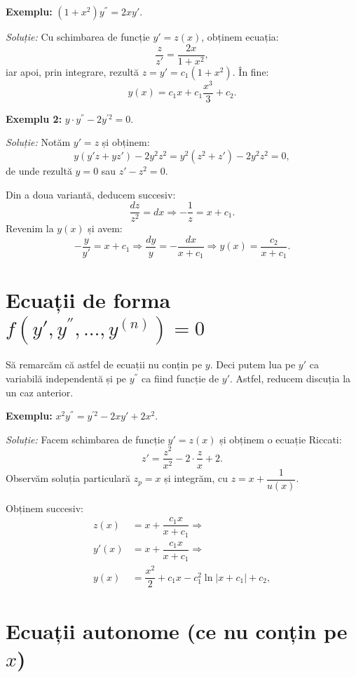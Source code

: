 \textbf{Exemplu:} $ (1 + x^2)y^{''} = 2xy' $.

\emph{Soluție:} Cu schimbarea de funcție $ y' = z(x) $, obținem ecuația:
\[
  \dfrac{z}{z'} = \dfrac{2x}{1 + x^2},
\]
iar apoi, prin integrare, rezultă $ z = y' = c_1(1 + x^2) $. În fine:
\[
  y(x) = c_1 x + c_1 \dfrac{x^3}{3} + c_2.
\]
\vspace{1cm}

\textbf{Exemplu 2:} $ y \cdot y^{''} - 2y^{'2} = 0 $.

\emph{Soluție:} Notăm $ y' = z $ și obținem:
\[
  y(y'z + yz') - 2y^2 z^2 = y^2(z^2 + z') - 2y^2 z^2 = 0,
\]
de unde rezultă $ y = 0 $ sau $ z' - z^2 = 0 $.

Din a doua variantă, deducem succesiv:
\[
  \dfrac{dz}{z^2} = dx \Rightarrow -\dfrac{1}{z} = x + c_1.
\]
Revenim la $ y(x) $ și avem:
\[
  - \dfrac{y}{y'} = x + c_1 \Rightarrow \dfrac{dy}{y} = -\dfrac{dx}{x + c_1} %
  \Rightarrow y(x) = \dfrac{c_2}{x + c_1}.
\]


\section{Ecuații de forma $ f(y', y^{''}, \dots, y^{(n)}) = 0 $}

Să remarcăm că astfel de ecuații nu conțin pe $ y $. Deci putem lua pe $ y' $
ca variabilă independentă și pe $ y^{''} $ ca fiind funcție de $ y' $.
Astfel, reducem discuția la un caz anterior.

\textbf{Exemplu:} $ x^2 y^{''} = y^{'2} - 2xy' + 2x^2 $.

\emph{Soluție:} Facem schimbarea de funcție $ y' = z(x) $ și obținem o
ecuație Riccati:
\[
  z' = \dfrac{z^2}{x^2} - 2 \cdot \dfrac{z}{x} + 2.
\]
Observăm soluția particulară $ z_p = x $ și integrăm, cu $ z = x + \dfrac{1}{u(x)} $.

Obținem succesiv:
\begin{align*}
  z(x) &= x + \dfrac{c_1x}{x + c_1} \Rightarrow \\
  y'(x) &= x + \dfrac{c_1x}{x + c_1} \Rightarrow \\
  y(x) &= \dfrac{x^2}{2} + c_1 x - c_1^2 \ln | x + c_1 | + c_2,
\end{align*}


\section{Ecuații autonome (ce nu conțin pe $ x $)}


